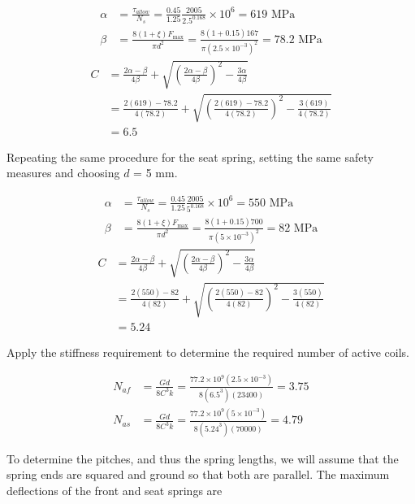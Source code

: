 \documentclass[
10pt,
a4paper,
openany,
svgnames,
]{book}
\begin{document}
\begin{solution}
  \begin{align*}
    \alpha  &= \frac{\tau _{allow}}{N_s} = \frac{0.45}{1.25}\frac{2005}{2.5^{0.168}} \times 10^6 = 619 \text{ MPa} \\ 
    \beta  &= \frac{8(1 + \xi )F_{\max}}{\pi d^2} = \frac{8(1 + 0.15)167}{\pi (2.5 \times 10^{-3})^2} = 78.2 \text{ MPa}
  \end{align*}
  \begin{align*}
    C &= \frac{2\alpha  - \beta}{4\beta} + \sqrt {\left( \frac{2\alpha  - \beta}{4\beta} \right)^2 - \frac{3\alpha}{4\beta}}  \\ 
      & = \frac{2(619) - 78.2}{4(78.2)} + \sqrt {\left( \frac{2(619) - 78.2}{4(78.2)} \right)^2 - \frac{3(619)}{4(78.2)}}  \\ 
      &= 6.5 
  \end{align*}

  Repeating the same procedure for the seat spring, setting the same safety measures and choosing $d$ = 5 mm.

  \begin{align*}
    \alpha &= \frac{\tau_{allow}}{N_s} = \frac{0.45}{1.25}\frac{2005}{5^{0.168}} \times 10^6 = 550\text{ MPa} \\ 
    \beta &= \frac{8(1 + \xi )F_{\max}}{\pi d^2} = \frac{8(1 + 0.15)700}{\pi (5 \times 10^{-3})^2} = 82\text{ MPa}
  \end{align*}
  \begin{align*}
    C &= \frac{2\alpha  - \beta}{4\beta} + \sqrt {\left( \frac{2\alpha  - \beta}{4\beta} \right)^2 - \frac{3\alpha}{4\beta}}  \\ 
      &= \frac{2(550) - 82}{4(82)} + \sqrt {\left( \frac{2(550) - 82}{4(82)} \right)^2 - \frac{3(550)}{4(82)}}  \\ 
      &= 5.24
  \end{align*}

  Apply the stiffness requirement to determine the required number of active coils.

  \begin{align*}
    N_{af} &= \frac{Gd}{8C^3k} = \frac{77.2 \times 10^9(2.5 \times 10^{-3})}{8(6.5^3)(23400)} = 3.75 \\
    N_{as} &= \frac{Gd}{8C^3k} = \frac{77.2 \times 10^9(5 \times 10^{-3})}{8(5.24^3)(70000)} = 4.79
  \end{align*}

  To determine the pitches, and thus the spring lengths, we will assume that the spring ends are squared and ground so that both are parallel. The maximum deflections of the front and seat springs are


\end{solution}
\end{document}
